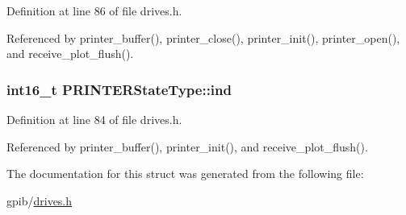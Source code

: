 Definition at line 86 of file drives.\+h.



Referenced by printer\+\_\+buffer(), printer\+\_\+close(), printer\+\_\+init(), printer\+\_\+open(), and receive\+\_\+plot\+\_\+flush().

\subsubsection[{\texorpdfstring{ind}{ind}}]{\setlength{\rightskip}{0pt plus 5cm}int16\+\_\+t P\+R\+I\+N\+T\+E\+R\+State\+Type\+::ind}\hypertarget{structPRINTERStateType_a7d8873d0011f31d7dd00c2b7e0d362bd}{}\label{structPRINTERStateType_a7d8873d0011f31d7dd00c2b7e0d362bd}


Definition at line 84 of file drives.\+h.



Referenced by printer\+\_\+buffer(), printer\+\_\+init(), and receive\+\_\+plot\+\_\+flush().



The documentation for this struct was generated from the following file\+:\begin{DoxyCompactItemize}
\item 
gpib/\hyperlink{drives_8h}{drives.\+h}\end{DoxyCompactItemize}
